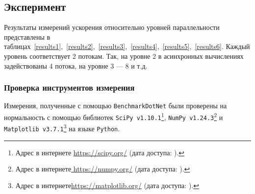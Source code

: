 \subsection{Эксперимент}
Результаты измерений ускорения относительно уровней параллельности представлены в таблицах~\ref{results1},~\ref{results2},~\ref{results3},~\ref{results4},~\ref{results5},~\ref{results6}. Каждый уровень соответствует 2 потокам. Так, на уровне 2 в асинхронных вычислениях задействованы 4 потока, на уровне 3 --- 8 и т.д. 

\subsubsection*{Проверка инструментов измерения}
Измерения, полученные с помощью \texttt{BenchmarkDotNet} были проверены на нормальность с помощью библиотек \texttt{SciPy v1.10.1}\footnote{Адрес в интернете \url{https://scipy.org/} (дата доступа:   ).}, \texttt{NumPy v1.24.3}\footnote{Адрес в интернете\url{ https://numpy.org/} (дата доступа:   ).} и \texttt{Matplotlib v3.7.1}\footnote{Адрес в интернете\url{https://matplotlib.org/} (дата доступа: ).} на языке \texttt{Python}.

